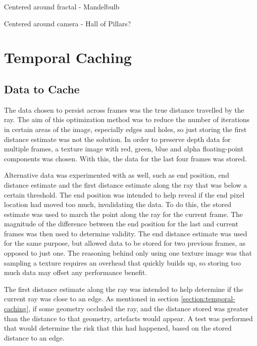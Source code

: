 Centered around fractal - Mandelbulb

Centered around camera - Hall of Pillars?

\section{Temporal Caching}

\subsection{Data to Cache}

The data chosen to persist across frames was the true distance travelled by the ray. The aim of this optimization method was to reduce the number of iterations in certain areas of the image, especially edges and holes, so just storing the first distance estimate was not the solution. In order to preserve depth data for multiple frames, a texture image with red, green, blue and alpha floating-point components was chosen. With this, the data for the last four frames was stored.\newline

Alternative data was experimented with as well, such as end position, end distance estimate and the first distance estimate along the ray that was below a certain threshold. The end position was intended to help reveal if the end pixel location had moved too much, invalidating the data. To do this, the stored estimate was used to march the point along the ray for the current frame. The magnitude of the difference between the end position for the last and current frames was then used to determine validity. The end distance estimate was used for the same purpose, but allowed data to be stored for two previous frames, as opposed to just one. The reasoning behind only using one texture image was that sampling a texture requires an overhead that quickly builds up, so storing too much data may offset any performance benefit.\newline

The first distance estimate along the ray was intended to help determine if the current ray was close to an edge. As mentioned in section \ref{section:temporal-caching}, if some geometry occluded the ray, and the distance stored was greater than the distance to that geometry, artefacts would appear. A test was performed that would determine the risk that this had happened, based on the stored distance to an edge.\newline

